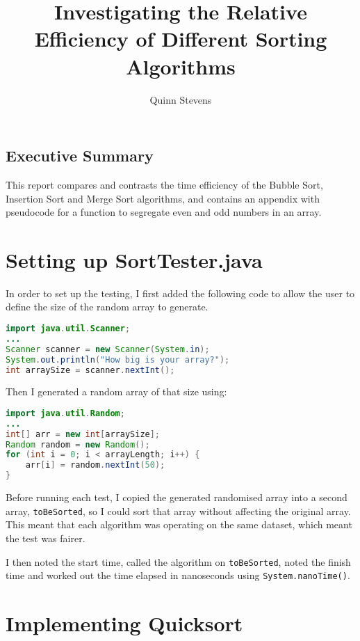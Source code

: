 \documentclass{report}
\author{Quinn Stevens}
\title{Investigating the Relative Efficiency of Different Sorting Algorithms}
\begin{document}
\maketitle

\section*{Executive Summary}
This report compares and contrasts the time efficiency of the Bubble Sort, Insertion Sort and Merge Sort algorithms, and contains an appendix with pseudocode for a function to segregate even and odd numbers in an array.

\tableofcontents

\chapter{Setting up Sort\textunderscore Tester.java}
In order to set up the testing, I first added the following code to allow the user to define the size of the random array to generate.

\begin{lstlisting}[language=java, caption=Accepting user input]
import java.util.Scanner;
...
Scanner scanner = new Scanner(System.in);
System.out.println("How big is your array?");
int arraySize = scanner.nextInt();
\end{lstlisting}

Then I generated a random array of that size using:

\begin{lstlisting}[language=java, caption=Generating the randomised array]
import java.util.Random;
...
int[] arr = new int[arraySize];
Random random = new Random();
for (int i = 0; i < arrayLength; i++) {
    arr[i] = random.nextInt(50);
}
\end{lstlisting}

Before running each test, I copied the generated randomised array into a second array, \texttt{toBeSorted}, so I could sort that array without affecting the original array. This meant that each algorithm was operating on the same dataset, which meant the test was fairer.

I then noted the start time, called the algorithm on \texttt{toBeSorted}, noted the finish time and worked out the time elapsed in nanoseconds using \texttt{System.nanoTime()}.



\chapter{Implementing Quicksort}
\end{document}
